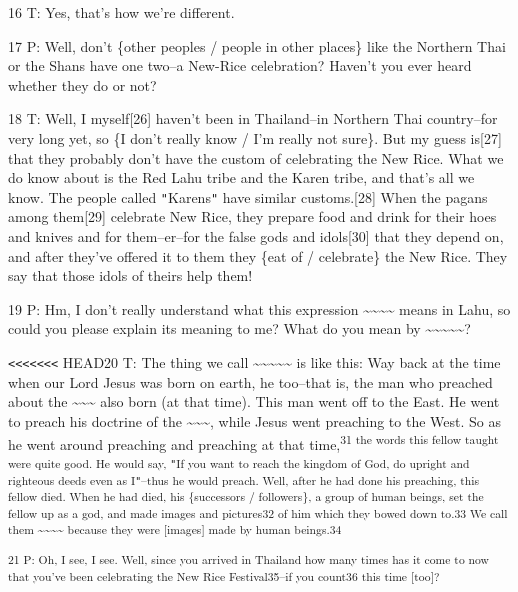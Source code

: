 16 T: Yes, that's how we're different.

17 P: Well, don't \{other peoples / people in other places\} like the Northern
Thai or the Shans have one two--a New-Rice celebration? Haven't you ever heard
whether they do or not?

18 T: Well, I myself[26] haven't been in Thailand--in Northern Thai country--for
very long yet, so \{I don't really know / I'm really not sure\}. But my guess is[27]
that they probably don't have the custom of celebrating the New Rice. What we do
know about is the Red Lahu tribe and the Karen tribe, and that's all we know. The
people called \texttt{"}Karens\texttt{"} have similar customs.[28] When the pagans
among them[29] celebrate New Rice, they prepare food and drink for their hoes and
knives and for them--er--for the false gods and idols[30] that they depend on,
and after they've offered it to them they \{eat of / celebrate\} the New Rice.
They say that those idols of theirs help them!

19 P: Hm, I don't really understand what this expression \textbf{\textasciitilde{}\textasciitilde{}\textasciitilde{}\textasciitilde{}}
means in Lahu, so could you please explain its meaning to me? What do you mean
by \textasciitilde{}\textasciitilde{}\textasciitilde{}\textasciitilde{}\textasciitilde{}?

\texttt{<}\texttt{<}\texttt{<}\texttt{<}\texttt{<}\texttt{<}\texttt{<} HEAD20 T:
The thing we call \textasciitilde{}\textasciitilde{}\textasciitilde{}\textasciitilde{}\textasciitilde{}
is like this: Way back at the time when our Lord Jesus was born on earth, he too--that
is, the man who preached about the \textasciitilde{}\textasciitilde{}\textasciitilde{}
also born (at that time). This man went off to the East. He went to preach his
doctrine of the \textasciitilde{}\textasciitilde{}\textasciitilde{}, while Jesus
went preaching to the West. So as he went around preaching and preaching at that
time,\textsuperscript{31 the words this fellow taught were quite good. He would
say, \texttt{"}If you want to reach the kingdom of God, do upright and righteous
deeds even as I\texttt{"}--thus he would preach. Well, after he had done his preaching,
this fellow died. When he had died, his \{successors / followers\}, a group of
human beings, set the fellow up as a god, and made images and pictures32 of him
which they bowed down to.33 We call them \textasciitilde{}\textasciitilde{}\textasciitilde{}\textasciitilde{}
because they were [images] made by human beings.34}

\textsuperscript{21 P: Oh, I see, I see. Well, since you arrived in Thailand how
many times has it come to now that you've been celebrating the New Rice Festival35--if
you count36 this time [too]?}

